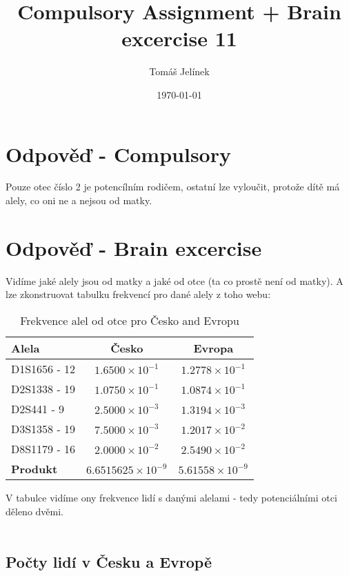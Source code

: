 \documentclass{article}
\title{Compulsory Assignment + Brain excercise 11}
\author{Tomáš Jelínek}
\date{\today}
\begin{document}
\maketitle
\section*{Odpověď - Compulsory}

Pouze otec číslo 2 je potencílním rodičem, ostatní lze vyloučit, protože dítě má alely, co oni ne a nejsou od matky.

\section*{Odpověď - Brain excercise}

Vidíme jaké alely jsou od matky a jaké od otce (ta co prostě není od matky). A lze zkonstruovat tabulku frekvencí pro dané alely z toho webu:

\begin{table}[h!]
    \centering
    \caption{Frekvence alel od otce pro Česko and Evropu}
    \label{tab:allele_frequencies}
    \begin{tabular}{|l|c|c|}
    \hline
    \textbf{Alela}        & \textbf{Česko}   & \textbf{Evropa}  \\ \hline
    D1S1656 - 12          & \( 1.6500 \times 10^{-1} \) & \( 1.2778 \times 10^{-1} \) \\ \hline
    D2S1338 - 19          & \( 1.0750 \times 10^{-1} \) & \( 1.0874 \times 10^{-1} \) \\ \hline
    D2S441 - 9            & \( 2.5000 \times 10^{-3} \) & \( 1.3194 \times 10^{-3} \) \\ \hline
    D3S1358 - 19          & \( 7.5000 \times 10^{-3} \) & \( 1.2017 \times 10^{-2} \) \\ \hline
    D8S1179 - 16          & \( 2.0000 \times 10^{-2} \) & \( 2.5490 \times 10^{-2} \) \\ \hline
    \textbf{Produkt}      & \( 6.6515625 \times 10^{-9} \) & \( 5.61558 \times 10^{-9} \) \\ \hline
    \end{tabular}
\end{table}

V tabulce vidíme ony frekvence lidí s danými alelami - tedy potenciálními otci děleno dvěmi.
\\
\\
\subsection*{Počty lidí v Česku a Evropě} 
\end{document}
